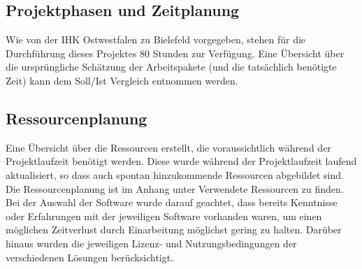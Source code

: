 \subsection{Projektphasen und Zeitplanung}

Wie von der IHK Ostwestfalen zu Bielefeld vorgegeben, stehen für die Durchführung dieses Projektes 80 Stunden zur Verfügung. Eine Übersicht über die ursprüngliche Schätzung der Arbeitspakete (und die tatsächlich benötigte Zeit) kann dem Soll/Ist Vergleich entnommen werden.

\subsection{Ressourcenplanung}

Eine Übersicht über die Ressourcen erstellt, die voraussichtlich während der Projektlaufzeit benötigt werden. Diese wurde während der Projektlaufzeit laufend aktualisiert, so dass auch spontan hinzukommende Ressourcen abgebildet sind. Die Ressourcenplanung ist im Anhang unter Verwendete Ressourcen zu finden\todo. Bei der Auswahl der Software wurde darauf geachtet, dass bereits Kenntnisse oder Erfahrungen mit der jeweiligen Software vorhanden waren, um einen möglichen Zeitverlust durch Einarbeitung möglichst gering zu halten. Darüber hinaus wurden die jeweiligen Lizenz- und Nutzungsbedingungen der verschiedenen Lösungen berücksichtigt.
